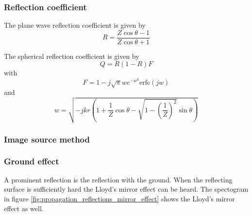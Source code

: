 \subsubsection{Reflection coefficient}

The plane wave reflection coefficient is given by
\begin{equation}\label{eq:theory:sound:reflection:plane}
 R = \frac{Z\cos{\theta}-1}{Z\cos{\theta}+1}
\end{equation}

The spherical reflection coefficient is given by
\begin{equation}\label{eq:theory:sound:reflection:spherical}
 Q = R \left(1 - R \right) F
\end{equation}
with 
\begin{equation}
 F = 1 - j \sqrt{ \pi} w e^{-w^2} \mathrm{erfc} \left( j w \right) 
\end{equation}
and
\begin{equation}
 w = \sqrt{-j k r  \left( 1 + \frac{1}{Z} \cos{\theta} - \sqrt{1 - \left( \frac{1}{Z} \right)^2} \sin{\theta} \right) }
\end{equation}







\subsubsection{Image source method}



\subsubsection{Ground effect}

A prominent reflection is the reflection with the ground. When the 
reflecting surface is sufficiently hard the Lloyd's 
mirror effect can be heard.
The spectogram in figure \ref{fig:propagation_reflections_mirror_effect} shows the Lloyd's mirror effect as well.





